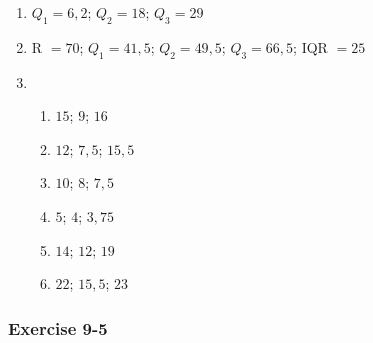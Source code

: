 {\begin{multicols}{3}
\begin{enumerate}[noitemsep, label=\textbf{\arabic*}.]
  \item $Q_1 = 6,2$; $ Q_2 = 18$; $Q_3 = 29$%

  \item R $= 70$; $Q_1 = 41,5$; $Q_2 = 49,5$; $Q_3 = 66,5$; IQR $= 25$  %

  \item %
\begin{enumerate}[noitemsep, label=\textbf{(\alph*)} ]
    \item $15$; $9$; $16$%
    \item $12$;  $7,5$; $15,5$%
    \item $10$; $8$; $7,5$%
    \item $5$; $4$; $3,75$ %
    \item $14$; $12$; $19$ %
    \item $22$; $15,5$; $23$%
    \end{enumerate}

  \end{enumerate}
\subsubsection*{Exercise 9-5} %
\begin{enumerate} [noitemsep, label=\textbf{\arabic*}.]


\end{enumerate}
\end{multicols}}
